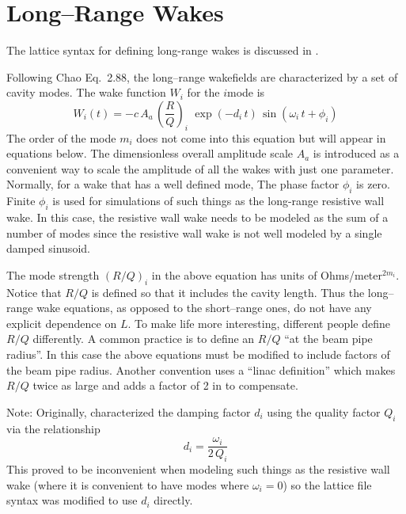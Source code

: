\section{Long--Range Wakes}
\label{s:lr.wake.eq}

The lattice syntax for defining long-range wakes is discussed in .

Following Chao\cite{b:chao} Eq.~2.88, the long--range wakefields are characterized by a set of
cavity modes. The wake function $W_i$ for the $i$\Th mode is
\begin{equation}
  W_i(t) = -c \, A_a \, \left( \frac{R}{Q} \right)_i \,\,
  \exp(-d_i \, t) \, \sin (\omega_i \, t + \phi_i)
  \label{wcrq}
\end{equation}
The order of the mode $m_i$ does not come into this equation but will appear in equations below.
The dimensionless overall amplitude scale $A_a$ is introduced as a convenient way to scale the
amplitude of all the wakes with just one parameter. Normally, for a wake that has a well defined
mode, The phase factor $\phi_i$ is zero. Finite $\phi_i$ is used for simulations of such things as
the long-range resistive wall wake. In this case, the resistive wall wake needs to be modeled as the
sum of a number of modes since the resistive wall wake is not well modeled by a single damped
sinusoid.

The mode strength $(R/Q)_i$ in the above equation has units of Ohms/meter$^{2m_i}$. Notice that
$R/Q$ is defined so that it includes the cavity length. Thus the long--range wake equations, as
opposed to the short--range ones, do not have any explicit dependence on $L$. To make life more
interesting, different people define $R/Q$ differently. A common practice is to define an $R/Q$ ``at
the beam pipe radius''. In this case the above equations must be modified to include factors of the
beam pipe radius. Another convention uses a ``linac definition'' which makes $R/Q$ twice as large
and adds a factor of 2 in  to compensate.

Note: Originally, \bmad characterized the damping factor $d_i$ using the quality factor $Q_i$ via the
relationship
\begin{equation}
  d_i = \frac{\omega_i}{2 \, Q_i}
  \label{do2q}
\end{equation}
This proved to be inconvenient when modeling such things as the resistive wall wake (where it is convenient
to have modes where $\omega_i = 0$) so the lattice file syntax was modified to use $d_i$ directly.

